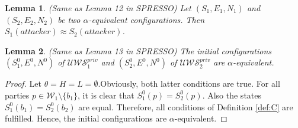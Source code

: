 \documentclass[letterpaper,onecolumn,10pt]{article}
\newtheorem{lemma}{Lemma}
\begin{document}
\begin{lemma}
  (Same as Lemma 12 in SPRESSO) Let $(S_1,E_1,N_1)$ and $(S_2,E_2,N_2)$ be two $\alpha$-equivalent configurations. Then $S_1(attacker)\approx S_2(attacker)$.
\end{lemma}

\begin{lemma}
  (Same as Lemma 13 in SPRESSO) The initial configurations $(S_1^0,E^0,N^0)$ of $\mathcal{U\!W\!S}^{priv}_1$ and $(S_2^0,E^0,N^0)$ of $\mathcal{U\!W\!S}^{priv}_2$ are $\alpha$-equivalent.
\end{lemma}
\begin{proof}
  Let $\theta=H=L=\emptyset$.Obviously, both latter conditions are true. For all parties $p\in\mathcal{W}_1\setminus\{b_1\}$, it is clear that $S^0_1(p)=S^0_2(p)$.
  Also the states $S^0_1(b_1)=S^0_2(b_2)$ are equal. Therefore, all conditions of Definition \ref{def:C} are fulfilled. Hence, the  initial configurations are $\alpha$-equivalent.
\end{proof}
\end{document}
